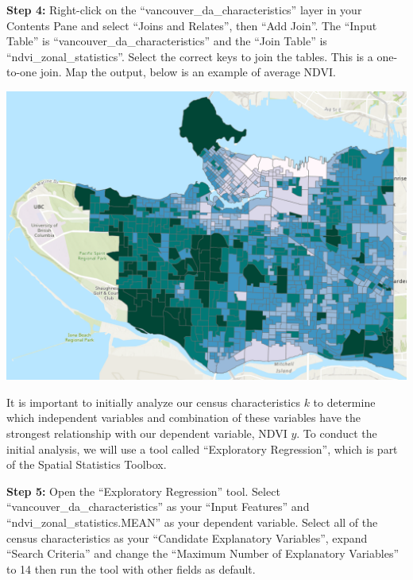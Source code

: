 \documentclass[
]{book}
\begin{document}
\textbf{Step 4:} Right-click on the ``vancouver\_da\_characteristics'' layer in your Contents Pane and select ``Joins and Relates'', then ``Add Join''. The ``Input Table'' is ``vancouver\_da\_characteristics'' and the ``Join Table'' is ``ndvi\_zonal\_statistics''. Select the correct keys to join the tables. This is a one-to-one join. Map the output, below is an example of average NDVI.

\includegraphics[width=1\linewidth]{images/05-arcgis-ndvi-mean}

It is important to initially analyze our census characteristics \(k\) to determine which independent variables and combination of these variables have the strongest relationship with our dependent variable, NDVI \(y\). To conduct the initial analysis, we will use a tool called ``Exploratory Regression'', which is part of the Spatial Statistics Toolbox.

\textbf{Step 5:} Open the ``Exploratory Regression'' tool. Select ``vancouver\_da\_characteristics'' as your ``Input Features'' and ``ndvi\_zonal\_statistics.MEAN'' as your dependent variable. Select all of the census characteristics as your ``Candidate Explanatory Variables'', expand ``Search Criteria'' and change the ``Maximum Number of Explanatory Variables'' to 14 then run the tool with other fields as default.
\end{document}
